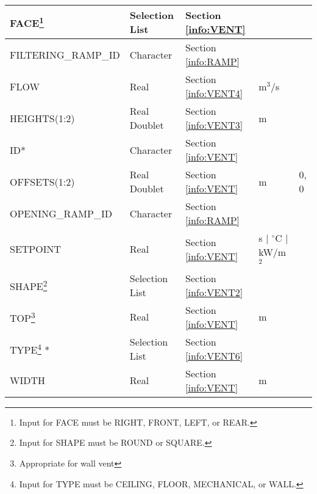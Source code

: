 \begin{minipage}{6.5in}
\begin{longtable}{@{\extracolsep{\fill}}|l|l|l|l|l|}
{\ct FACE}\footnote{Input for {\ct FACE} must be {\ct RIGHT}, {\ct FRONT}, {\ct LEFT}, or {\ct REAR}.}      	  & Selection List   & Section \ref{info:VENT}                 &                             &                 \\ \hline
{\ct FILTERING\_RAMP\_ID}    					 & Character  		  & Section \ref{info:RAMP}      &                             &                 \\ \hline
{\ct FLOW}      	 					 & Real  		  & Section \ref{info:VENT4}     & m$^3$/s                     &                 \\ \hline
{\ct HEIGHTS(1:2)}      					 & Real Doublet  	  & Section \ref{info:VENT3}     & m                           &                 \\ \hline
{\ct ID}*                                                         & Character  	          & Section \ref{info:VENT}      &                             &                 \\ \hline
{\ct OFFSETS(1:2)}       					 & Real Doublet 		  & Section \ref{info:VENT}      & m                           &      0, 0        \\ \hline
{\ct OPENING\_RAMP\_ID}  					 & Character  		  & Section \ref{info:RAMP}      &                             &                 \\ \hline
{\ct SETPOINT}           					 & Real  	          & Section \ref{info:VENT}      & s $\mid$ $^\circ$C $\mid$ kW/m$^2$ &                 \\ \hline
{\ct SHAPE}\footnote{Input for {\ct SHAPE} must be {\ct ROUND} or {\ct SQUARE}.}
                                                                 & Selection List         & Section \ref{info:VENT2}     &                             &                 \\ \hline
{\ct TOP}\footnote{Appropriate for wall vent}                    & Real  	  	  & Section \ref{info:VENT}      & m                           &                 \\ \hline
{\ct TYPE}\footnote{Input for {\ct TYPE} must be {\ct CEILING}, {\ct FLOOR}, {\ct MECHANICAL}, or {\ct WALL}. } *
                                                                 & Selection List         & Section \ref{info:VENT6}     &                             &                 \\ \hline
{\ct WIDTH}                                                      & Real                   & Section \ref{info:VENT}      & m                           &                 \\ \hline
\end{longtable}
\end{minipage}


